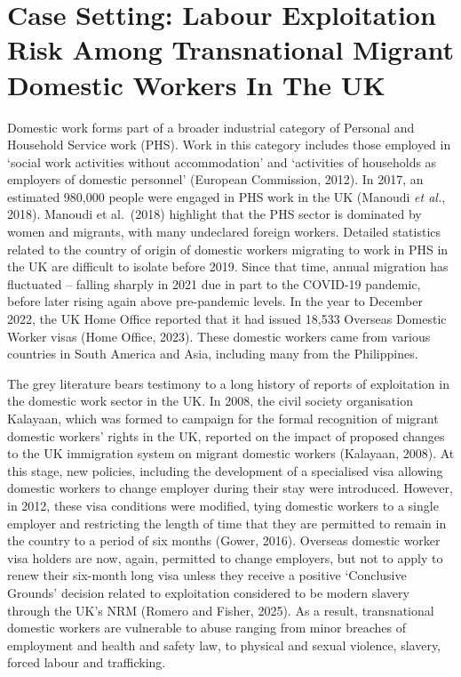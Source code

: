 \documentclass[
  12pt,
  letterpaper,
  DIV=11,
  numbers=noendperiod]{scrartcl}
\begin{document}
\section{Case Setting: Labour Exploitation Risk Among Transnational
Migrant Domestic Workers In The
UK}\label{case-setting-labour-exploitation-risk-among-transnational-migrant-domestic-workers-in-the-uk}

Domestic work forms part of a broader industrial category of Personal
and Household Service work (PHS). Work in this category includes those
employed in `social work activities without accommodation' and
`activities of households as employers of domestic personnel' (European
Commission, 2012). In 2017, an estimated 980,000 people were engaged in
PHS work in the UK (Manoudi \emph{et al.}, 2018). Manoudi et al.~(2018)
highlight that the PHS sector is dominated by women and migrants, with
many undeclared foreign workers. Detailed statistics related to the
country of origin of domestic workers migrating to work in PHS in the UK
are difficult to isolate before 2019. Since that time, annual migration
has fluctuated -- falling sharply in 2021 due in part to the COVID-19
pandemic, before later rising again above pre-pandemic levels. In the
year to December 2022, the UK Home Office reported that it had issued
18,533 Overseas Domestic Worker visas (Home Office, 2023). These
domestic workers came from various countries in South America and Asia,
including many from the Philippines.

The grey literature bears testimony to a long history of reports of
exploitation in the domestic work sector in the UK. In 2008, the civil
society organisation Kalayaan, which was formed to campaign for the
formal recognition of migrant domestic workers' rights in the UK,
reported on the impact of proposed changes to the UK immigration system
on migrant domestic workers (Kalayaan, 2008). At this stage, new
policies, including the development of a specialised visa allowing
domestic workers to change employer during their stay were introduced.
However, in 2012, these visa conditions were modified, tying domestic
workers to a single employer and restricting the length of time that
they are permitted to remain in the country to a period of six months
(Gower, 2016). Overseas domestic worker visa holders are now, again,
permitted to change employers, but not to apply to renew their six-month
long visa unless they receive a positive `Conclusive Grounds' decision
related to exploitation considered to be modern slavery through the UK's
NRM (Romero and Fisher, 2025). As a result, transnational domestic
workers are vulnerable to abuse ranging from minor breaches of
employment and health and safety law, to physical and sexual violence,
slavery, forced labour and trafficking.
\end{document}
